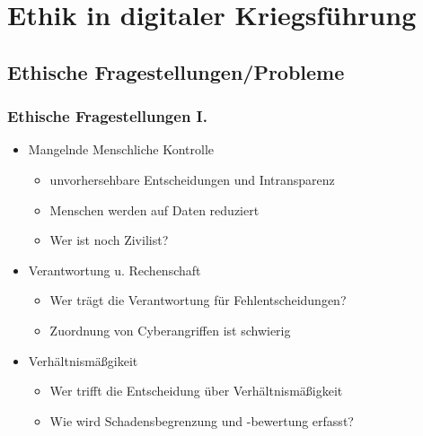 \documentclass[12pt]{beamer}
\begin{document}
\section{Ethik in digitaler Kriegsführung}
\subsection{Ethische Fragestellungen/Probleme}

\begin{frame}
    \frametitle{Ethische Fragestellungen I.}
    \begin{itemize}
        \item Mangelnde Menschliche Kontrolle
        \begin{itemize}
            \item unvorhersehbare Entscheidungen und Intransparenz\cite{d21}
            \item Menschen werden auf Daten reduziert \cite{d21}
            \item Wer ist noch Zivilist? \cite{netzpol}
        \end{itemize}
        \item Verantwortung u. Rechenschaft
        \begin{itemize}
            \item Wer trägt die Verantwortung für Fehlentscheidungen? \cite{d21}
            \item Zuordnung von Cyberangriffen ist schwierig \cite{rowe}
        \end{itemize}
        \item Verhältnismäßgikeit
        \begin{itemize}
            \item Wer trifft die Entscheidung über Verhältnismäßigkeit
            \item Wie wird Schadensbegrenzung und -bewertung erfasst? \cite{rowe}
        \end{itemize}
    \end{itemize}  
\end{frame}
\end{document}
